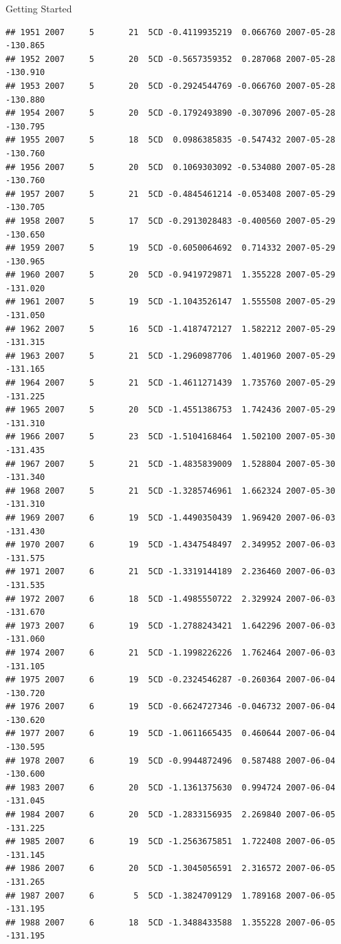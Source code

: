 \documentclass[
  ignorenonframetext,
]{beamer}
\begin{document}
\begin{frame}[fragile]{Getting Started}
\begin{verbatim}
## 1951 2007     5       21  5CD -0.4119935219  0.066760 2007-05-28 -130.865
## 1952 2007     5       20  5CD -0.5657359352  0.287068 2007-05-28 -130.910
## 1953 2007     5       20  5CD -0.2924544769 -0.066760 2007-05-28 -130.880
## 1954 2007     5       20  5CD -0.1792493890 -0.307096 2007-05-28 -130.795
## 1955 2007     5       18  5CD  0.0986385835 -0.547432 2007-05-28 -130.760
## 1956 2007     5       20  5CD  0.1069303092 -0.534080 2007-05-28 -130.760
## 1957 2007     5       21  5CD -0.4845461214 -0.053408 2007-05-29 -130.705
## 1958 2007     5       17  5CD -0.2913028483 -0.400560 2007-05-29 -130.650
## 1959 2007     5       19  5CD -0.6050064692  0.714332 2007-05-29 -130.965
## 1960 2007     5       20  5CD -0.9419729871  1.355228 2007-05-29 -131.020
## 1961 2007     5       19  5CD -1.1043526147  1.555508 2007-05-29 -131.050
## 1962 2007     5       16  5CD -1.4187472127  1.582212 2007-05-29 -131.315
## 1963 2007     5       21  5CD -1.2960987706  1.401960 2007-05-29 -131.165
## 1964 2007     5       21  5CD -1.4611271439  1.735760 2007-05-29 -131.225
## 1965 2007     5       20  5CD -1.4551386753  1.742436 2007-05-29 -131.310
## 1966 2007     5       23  5CD -1.5104168464  1.502100 2007-05-30 -131.435
## 1967 2007     5       21  5CD -1.4835839009  1.528804 2007-05-30 -131.340
## 1968 2007     5       21  5CD -1.3285746961  1.662324 2007-05-30 -131.310
## 1969 2007     6       19  5CD -1.4490350439  1.969420 2007-06-03 -131.430
## 1970 2007     6       19  5CD -1.4347548497  2.349952 2007-06-03 -131.575
## 1971 2007     6       21  5CD -1.3319144189  2.236460 2007-06-03 -131.535
## 1972 2007     6       18  5CD -1.4985550722  2.329924 2007-06-03 -131.670
## 1973 2007     6       19  5CD -1.2788243421  1.642296 2007-06-03 -131.060
## 1974 2007     6       21  5CD -1.1998226226  1.762464 2007-06-03 -131.105
## 1975 2007     6       19  5CD -0.2324546287 -0.260364 2007-06-04 -130.720
## 1976 2007     6       19  5CD -0.6624727346 -0.046732 2007-06-04 -130.620
## 1977 2007     6       19  5CD -1.0611665435  0.460644 2007-06-04 -130.595
## 1978 2007     6       19  5CD -0.9944872496  0.587488 2007-06-04 -130.600
## 1983 2007     6       20  5CD -1.1361375630  0.994724 2007-06-04 -131.045
## 1984 2007     6       20  5CD -1.2833156935  2.269840 2007-06-05 -131.225
## 1985 2007     6       19  5CD -1.2563675851  1.722408 2007-06-05 -131.145
## 1986 2007     6       20  5CD -1.3045056591  2.316572 2007-06-05 -131.265
## 1987 2007     6        5  5CD -1.3824709129  1.789168 2007-06-05 -131.195
## 1988 2007     6       18  5CD -1.3488433588  1.355228 2007-06-05 -131.195

\end{verbatim}
\end{frame}
\end{document}
